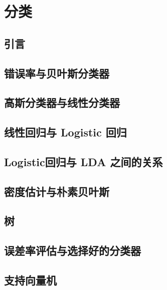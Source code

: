 \chapter{分类}

\section{引言}

\pending

\section{错误率与贝叶斯分类器}

\pending

\section{高斯分类器与线性分类器}

\pending

\section{线性回归与 Logistic 回归}

\pending

\section{Logistic回归与 LDA 之间的关系}

\pending

\section{密度估计与朴素贝叶斯}

\pending

\section{树}

\pending

\section{误差率评估与选择好的分类器}

\pending

\section{支持向量机}

